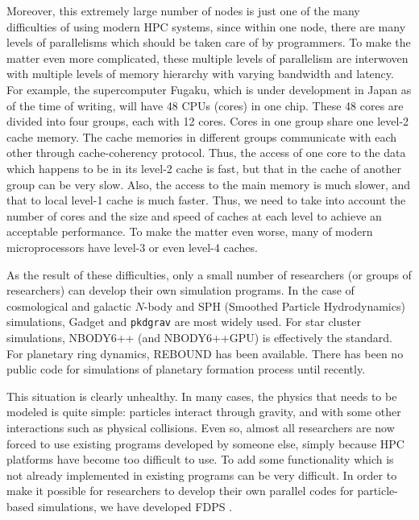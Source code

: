 \documentclass[dvipdfmx]{pasj01}
\begin{document}
Moreover, this extremely large number of nodes is just one of the many
difficulties of using modern HPC systems, since within one node, there
are many levels of parallelisms which should be taken care of by
programmers. To make the matter even more complicated, these multiple
levels of parallelism are interwoven with multiple levels of memory
hierarchy with varying bandwidth and latency. For example, the
supercomputer Fugaku, which is under development in Japan as of the
time of writing, will have 48 CPUs (cores) in one chip. These 48 cores
are divided into four groups, each with 12 cores. Cores in one group
share one level-2 cache memory. The cache memories in different groups
communicate with each other through cache-coherency protocol. Thus,
the access of one core to the data which happens to be in its level-2
cache is fast, but that in the cache of another group can be very
slow. Also, the access to the main memory is much slower, and that to
local level-1 cache is much faster. Thus, we need to take into account
the number of cores and the size and speed of caches at each level to
achieve an acceptable performance. To make the matter even worse, many
of modern microprocessors have level-3 or even level-4 caches.

As the result of these difficulties, only a small number of
researchers (or groups of researchers) can develop their own
simulation programs. In the case of cosmological and galactic $N$-body
and SPH (Smoothed Particle Hydrodynamics) simulations, Gadget
\citep{2005MNRAS.364.1105S} and {\tt pkdgrav} \citep{Stadel2001} are
most widely used. For star cluster simulations, NBODY6++ (and
NBODY6++GPU) \citep{2012MNRAS.424..545N} is effectively the
standard. For planetary ring dynamics, REBOUND \citep{ReinLiu2012} has
been available. There has been no public code for simulations of
planetary formation process until recently.

This situation is clearly unhealthy. In many cases, the physics that
needs to be modeled is quite simple: particles interact through
gravity, and with some other interactions such as physical
collisions. Even so, almost all researchers are now forced to use
existing programs developed by someone else, simply because HPC
platforms have become too difficult to use. To add some functionality
which is not already implemented in existing programs can be very
difficult. In order to make it possible for researchers to develop
their own parallel codes for particle-based simulations, we have
developed FDPS \citep{Iwasawaetal2016}.
\end{document}
